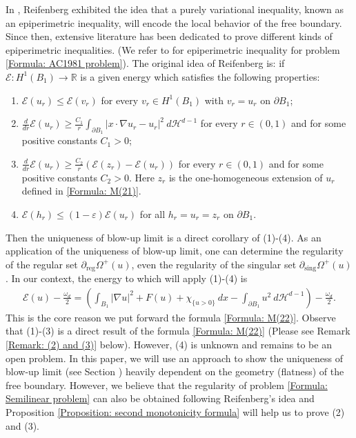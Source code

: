 \documentclass[11pt,reqno]{amsart}
\begin{document}
\begin{remark}\label{Remark: Reifenberg}
	In \cite{R1964}, Reifenberg exhibited the idea that a purely variational inequality, known as an epiperimetric inequality, will encode the local behavior of the free boundary. Since then, extensive literature has been dedicated to prove different kinds of epiperimetric inequalities. (We refer to \cite{SV2019} for epiperimetric inequality for problem \eqref{Formula: AC1981 problem}). The  original idea of Reifenberg is: if $\mathcal{E}\colon H^{1}(B_{1})\to\mathbb{R}$ is a given energy which satisfies the following properties:
	\begin{enumerate}
		\item $\mathcal{E}(u_{r})\leqslant\mathcal{E}(v_{r})$ for every $v_{r}\in H^{1}(B_{1})$ with $v_{r}=u_{r}$ on $\partial B_{1}$;
		\item $\frac{d}{dr}\mathcal{E}(u_{r})\geqslant\frac{C_{1}}{r}\int_{\partial B_{1}}|x\cdot\nabla u_{r}-u_{r}|^{2}\:d\mathcal{H}^{d-1}$ for every $r\in (0,1)$ and for some positive constants $C_{1}>0$;
		\item $\frac{d}{dr}\mathcal{E}(u_{r})\geqslant\frac{C_{2}}{r}(\mathcal{E}(z_{r})-\mathcal{E}(u_{r}))$ for every $r\in(0,1)$ and for some positive constants $C_{2}>0$. Here $z_{r}$ is the one-homogeneous extension of $u_{r}$ defined in \eqref{Formula: M(21)}.
		\item $\mathcal{E}(h_{r})\leqslant(1-\varepsilon)\mathcal{E}(u_{r})$ for all $h_{r}=u_{r}=z_{r}$ on $\partial B_{1}$.
	\end{enumerate}
	Then the uniqueness of blow-up limit is a direct corollary of (1)-(4). As an application of the uniqueness of blow-up limit, one can determine the regularity of the regular set  $\partial_{\mathrm{reg}}\varOmega^{+}(u)$, even the regularity of the  singular set $\partial_{\mathrm{sing}}\varOmega^{+}(u)$. In our context, the energy to which will apply (1)-(4) is 
	\begin{align*}
		\mathcal{E}(u)-\frac{\omega_{d}}{2}=\left(\int_{B_{1}}|\nabla u|^{2}+F(u)+\chi_{\{u>0\}}\:dx-\int_{\partial B_{1}}u^{2}\:d\mathcal{H}^{d-1}\right)-\frac{\omega_{d}}{2}.
	\end{align*}
	This is the core reason we put forward the formula \eqref{Formula: M(22)}. Observe that (1)-(3) is a direct result of the formula \eqref{Formula: M(22)} (Please see Remark \ref{Remark: (2) and (3)} below). However, (4) is unknown and remains to be an open problem. In this paper, we will use an approach to show the uniqueness of blow-up limit (see Section ) heavily dependent on the geometry (flatness) of the free boundary. However, we believe that the regularity of problem \eqref{Formula: Semilinear problem} can also be obtained following Reifenberg's idea and Proposition \ref{Proposition: second monotonicity formula} will help us to prove (2) and (3).
\end{remark}
\end{document}
